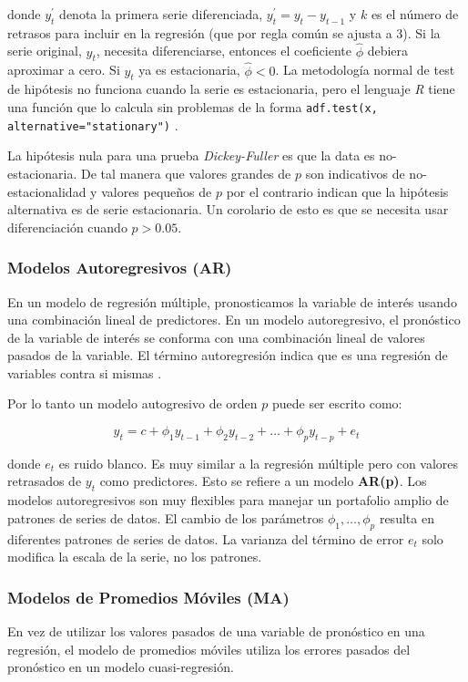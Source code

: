 donde $y_{t}^{\prime}$ denota la primera serie diferenciada, $y_{t}^{\prime} = y_{t} - y_{t-1}$ y $k$ es el número de retrasos para incluir en la regresión (que por regla común se ajusta a 3). Si la serie original, $y_{t}$, necesita diferenciarse, entonces el coeficiente $\hat{\phi}$ debiera aproximar a cero. Si $y_{t}$ ya es estacionaria, $\hat{\phi} < 0$. La metodología normal de test de hipótesis no funciona cuando la serie es estacionaria, pero el lenguaje \emph{R} tiene una función que lo calcula sin problemas de la forma \texttt{adf.test(x, alternative="stationary")} \cite{packageForecast}.

La hipótesis nula para una prueba \emph{Dickey-Fuller} es que la data es no-estacionaria. De tal manera que valores grandes de $p$ son indicativos de no-estacionalidad y valores pequeños de $p$ por el contrario indican que la hipótesis alternativa es de serie estacionaria. Un corolario de esto es que se necesita usar diferenciación cuando $p > 0.05$.

\subsubsection{Modelos Autoregresivos (AR)}
En un modelo de regresión múltiple, pronosticamos la variable de interés usando una combinación lineal de predictores. En un modelo autoregresivo, el pronóstico de la variable de interés se conforma con una combinación lineal de valores pasados de la variable. El término autoregresión indica que es una regresión de variables contra si mismas \cite{hyndman}.

Por lo tanto un modelo autogresivo de orden $p$ puede ser escrito como:

\[ y_{t} = c + \phi_{1}y_{t-1} + \phi_{2}y_{t-2} + \ldots + \phi_{p}y_{t-p} + e_{t}  \]

donde $e_{t}$ es ruido blanco. Es muy similar a la regresión múltiple pero con valores retrasados de $y_{t}$ como predictores. Esto se refiere a un modelo \textbf{AR(p)}. Los modelos autoregresivos son muy flexibles para manejar un portafolio amplio de patrones de series de datos. El cambio de los parámetros $\phi_1, \ldots, \phi_{p}$ resulta en diferentes patrones de series de datos. La varianza del término de error $e_t$ solo modifica la escala de la serie, no los patrones.

\subsubsection{Modelos de Promedios Móviles (MA)}
En vez de utilizar los valores pasados de una variable de pronóstico en una regresión, el modelo de promedios móviles utiliza los errores pasados del pronóstico en un modelo cuasi-regresión.


